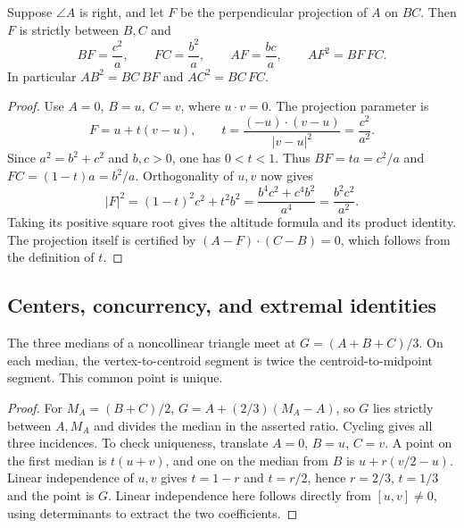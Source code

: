 \begin{theorem}
\label{tri:right-altitude}
Suppose $\angle A$ is right, and let $F$ be the perpendicular projection
of $A$ on $BC$.  Then $F$ is strictly between $B,C$ and
\[
 BF=\frac{c^2}{a},\qquad FC=\frac{b^2}{a},\qquad
 AF=\frac{bc}{a},\qquad AF^2=BF\,FC.
\]
In particular $AB^2=BC\,BF$ and $AC^2=BC\,FC$.
\end{theorem}
\begin{proof}
Use $A=0$, $B=u$, $C=v$, where $u\mathbin{\cdot}v=0$.
The projection parameter is
\[
 F=u+t(v-u),\qquad
 t=\frac{(-u)\mathbin{\cdot}(v-u)}{|v-u|^2}=\frac{c^2}{a^2}.
\]
Since $a^2=b^2+c^2$ and $b,c>0$, one has $0<t<1$.
Thus $BF=ta=c^2/a$ and $FC=(1-t)a=b^2/a$.
Orthogonality of $u,v$ now gives
\[
 |F|^2=(1-t)^2c^2+t^2b^2
 =\frac{b^4c^2+c^4b^2}{a^4}=\frac{b^2c^2}{a^2}.
\]
Taking its positive square root gives the altitude formula and its product
identity.  The projection itself is certified by
$(A-F)\mathbin{\cdot}(C-B)=0$, which follows from the definition of $t$.
\end{proof}

\subsection{Centers, concurrency, and extremal identities}

\begin{theorem}
\label{tri:centroid}
The three medians of a noncollinear triangle meet at
$G=(A+B+C)/3$.  On each median, the vertex-to-centroid segment is twice
the centroid-to-midpoint segment.  This common point is unique.
\end{theorem}
\begin{proof}
For $M_A=(B+C)/2$,
$G=A+(2/3)(M_A-A)$, so $G$ lies strictly between $A,M_A$ and divides
the median in the asserted ratio.  Cycling gives all three incidences.
To check uniqueness, translate $A=0$, $B=u$, $C=v$.  A point on the first
median is $t(u+v)$, and one on the median from $B$ is
$u+r(v/2-u)$.  Linear independence of $u,v$ gives
$t=1-r$ and $t=r/2$, hence $r=2/3$, $t=1/3$ and the point is $G$.
Linear independence here follows directly from $[u,v]\ne0$, using
determinants to extract the two coefficients.
\end{proof}

